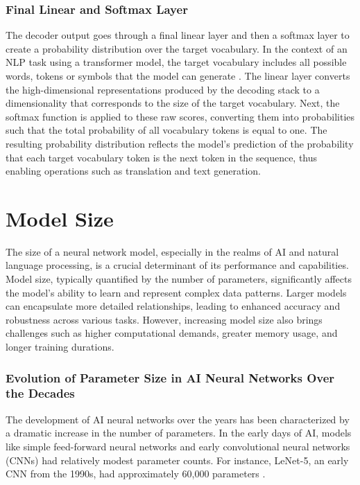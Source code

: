 \subsubsection{Final Linear and Softmax Layer}

The decoder output goes through a final linear layer and then a softmax layer to create a probability distribution over the target vocabulary. In the context of an NLP task using a transformer model, the target vocabulary includes all possible words, tokens or symbols that the model can generate \cite{jozefowicz2016exploring}. The linear layer converts the high-dimensional representations produced by the decoding stack to a dimensionality that corresponds to the size of the target vocabulary. Next, the softmax function is applied to these raw scores, converting them into probabilities such that the total probability of all vocabulary tokens is equal to one. The resulting probability distribution reflects the model's prediction of the probability that each target vocabulary token is the next token in the sequence, thus enabling operations such as translation and text generation.

\newpage

\section{Model Size}

The size of a neural network model, especially in the realms of AI and natural language processing, is a crucial determinant of its performance and capabilities. Model size, typically quantified by the number of parameters, significantly affects the model's ability to learn and represent complex data patterns. Larger models can encapsulate more detailed relationships, leading to enhanced accuracy and robustness across various tasks. However, increasing model size also brings challenges such as higher computational demands, greater memory usage, and longer training durations.

\subsubsection{Evolution of Parameter Size in AI Neural Networks Over the Decades}

The development of AI neural networks over the years has been characterized by a dramatic increase in the number of parameters. In the early days of AI, models like simple feed-forward neural networks and early convolutional neural networks (CNNs) had relatively modest parameter counts. For instance, LeNet-5, an early CNN from the 1990s, had approximately 60,000 parameters \cite{lecun1998gradient}.

